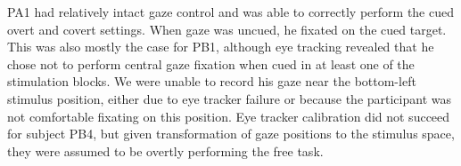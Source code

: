 
PA1 had relatively intact gaze control and was able to correctly perform the
cued overt and covert settings.
When gaze was uncued, he fixated on the cued target.
This was also mostly the case for PB1, although eye tracking revealed that he
chose not to perform central gaze fixation when cued in at least one of the
stimulation blocks. We were unable to record his gaze near the bottom-left
stimulus position, either due to eye tracker failure or because the participant
was not comfortable fixating on this position.
Eye tracker calibration did not succeed for subject PB4, but given
transformation of gaze positions to the stimulus space, they were assumed to
be overtly performing the free task.

